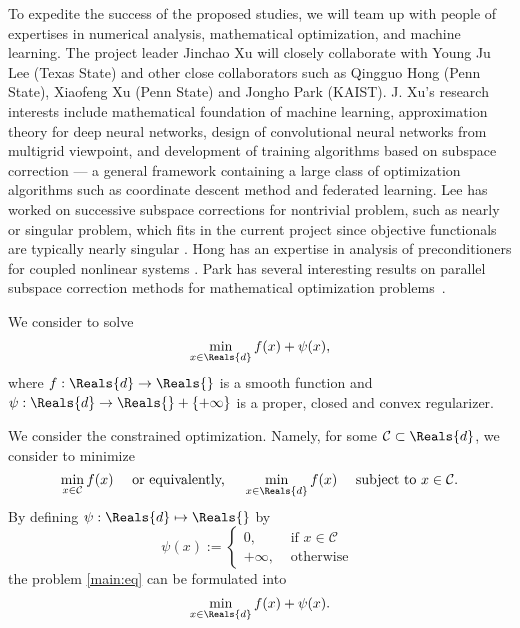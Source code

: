 To expedite the success of the proposed studies, we will team up with people of expertises in numerical analysis, mathematical optimization, and machine learning. The project leader Jinchao Xu will closely collaborate with Young Ju Lee (Texas State) and other close collaborators such as Qingguo Hong (Penn State), Xiaofeng Xu (Penn State) and Jongho Park (KAIST).  J. Xu's research interests include mathematical foundation of machine learning,  approximation theory for deep neural networks, design of convolutional neural networks from multigrid viewpoint, and development of training algorithms based on subspace correction --- a general framework containing a large class of optimization algorithms such as coordinate descent method and federated learning. Lee has worked on successive subspace corrections for nontrivial problem, such as nearly or singular problem, which fits in the current project since objective functionals are typically nearly singular \cite{chen2020robust,lee2009robust,LWXZ:2007}. Hong has an expertise in analysis of preconditioners for coupled nonlinear systems \cite{hong2016uniformly,hong2016robust,chen2020robust}. 
Park has several interesting results on parallel subspace correction methods for mathematical optimization problems~\cite{Park:2020,Park:2021,Park:2022}.



We consider to solve 
\begin{equation} 
\min_{x \in \Reals{d}} f(x) + \psi(x), 
\end{equation}
where $f : \Reals{d} \rightarrow \Reals{}$ is a smooth function and $\psi : \Reals{d} \rightarrow \Reals{} + \{+\infty\}$ is a proper, closed and convex regularizer. 

We consider the constrained optimization. Namely, for some $\mathcal{C} \subset \Reals{d}$, we consider to minimize  
\begin{equation}\label{main:eq}  
\min_{x \in \mathcal{C}} f(x) \quad \mbox{ or equivalently, } \quad \min_{x \in \Reals{d}} f(x) \quad \mbox{ subject to } x \in \mathcal{C}.  
\end{equation}
By defining $\psi : \Reals{d} \mapsto \Reals{}$ by 
\begin{equation}
\psi(x) :=  \left \{ \begin{array}{cc} 
0, & \mbox{ if } x \in \mathcal{C} \\
+\infty, & \mbox{ otherwise } 
\end{array} \right . 
\end{equation}
the problem \eqref{main:eq} can be formulated into 
\begin{equation} 
\min_{x \in \Reals{d}} f(x) + \psi(x).  
\end{equation}

